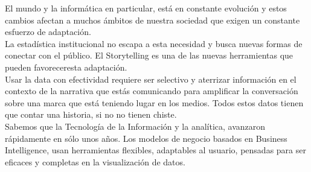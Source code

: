 \documentclass[preprint,12pt]{elsarticle}
\begin{document}
		El mundo y la informática en particular, está en constante evolución y estos cambios afectan a muchos ámbitos de nuestra sociedad que exigen un constante esfuerzo de adaptación.\\

La estadística institucional no escapa a esta necesidad y busca nuevas formas de conectar con el público. El Storytelling es una de las nuevas herramientas que pueden favoreceresta adaptación.\\

Usar la data con efectividad requiere ser selectivo y aterrizar información en el contexto de la narrativa que estás comunicando para amplificar la conversación sobre una marca que está teniendo lugar en los medios. Todos estos datos tienen que contar una historia, si no no tienen chiste. \\

Sabemos que la Tecnología de la Información y la analítica, avanzaron rápidamente en sólo unos años. Los modelos de negocio basados en Business Intelligence, usan herramientas flexibles, adaptables al usuario, pensadas para ser eficaces y completas en la visualización de datos.\\

	

	
	
	\newpage
	
			
	\cite{wuttig2007phase}
	\cite{knaflic2015storytelling}
	\cite{lundby2008digital}

	
	
	
	
	
	
	
	
	
	
	
	
	
\end{document}
